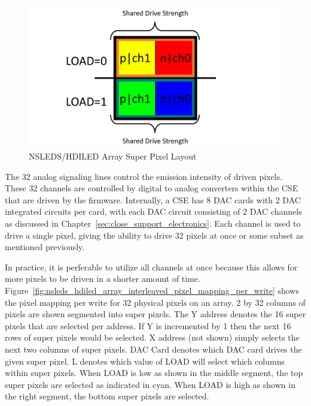     \begin{figure}
        \centering
        \includegraphics[trim=0in 0in 0in 0in,width=1.0\textwidth]{fig/superpixel_layout.pdf}
        \caption{NSLEDS/HDILED Array Super Pixel Layout}
        \label{fig:nsleds_hdiled_array_superpixel_layout}
    \end{figure}

    The 32 analog signaling lines control the emission intensity of driven pixels. These 32 channels are controlled by digital to analog converters within the CSE that are driven by the firmware. Internally, a CSE has 8 DAC cards with 2 DAC integrated circuits per card, with each DAC circuit consisting of 2 DAC channels as discussed in Chapter~\ref{sec:close_support_electronics}. Each channel is used to drive a single pixel, giving the ability to drive 32 pixels at once or some subset as mentioned previously.

    In practice, it is perferable to utilize all channels at once because this allows for more pixels to be driven in a shorter amount of time. Figure~\ref{fig:nsleds_hdiled_array_interleaved_pixel_mapping_per_write} shows the pixel mapping per write for 32 physical pixels on an array. 2 by 32 columns of pixels are shown segmented into super pixels. The Y address denotes the 16 super pixels that are selected per address. If Y is incremented by 1 then the next 16 rows of super pixels would be selected. X address (not shown) simply selects the next two columns of super pixels. DAC Card denotes which DAC card drives the given super pixel. L denotes which value of LOAD will select which columns within super pixels. When LOAD is low as shown in the middle segment, the top super pixels are selected as indicated in cyan. When LOAD is high as shown in the right segment, the bottom super pixels are selected.

